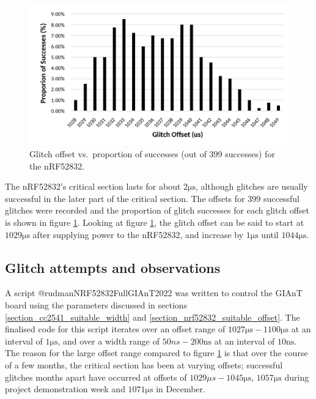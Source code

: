 \begin{figure}
\centering
\includegraphics[width=5.72917in,height=\textheight]{res/nrf52832_offset_vs_success.png}
\caption{Glitch offset vs.~proportion of successes (out of 399
successes) for the nRF52832.\label{img_nrf52832_offset_vs_success}}
\end{figure}

The nRF52832's critical section lasts for about \(2\si{\micro\second}\),
although glitches are usually successful in the later part of the
critical section. The offsets for 399 successful glitches were recorded
and the proportion of glitch successes for each glitch offset is shown
in figure \ref{img_nrf52832_offset_vs_success}. Looking at figure
\ref{img_nrf52832_offset_vs_success}, the glitch offset can be said to
start at \(1029\si{\micro\second}\) after supplying power to the
nRF52832, and increase by \(1\si{\micro\second}\) until
\(1044\si{\micro\second}\).

\newpage

\hypertarget{glitch-attempts-and-observations}{%
\subsection{\texorpdfstring{Glitch attempts and
observations\label{section_nrf52832_observations}}{Glitch attempts and observations}}\label{glitch-attempts-and-observations}}

A script @rudmanNRF52832FullGIAnT2022 was written to control the GIAnT
board using the parameters discussed in sections
\ref{section_cc2541_suitable_width} and
\ref{section_nrf52832_suitable_offset}. The finalised code for this
script iterates over an offset range of
\(1027\si{\micro\second} - 1100\si{\micro\second}\) at an interval of
\(1\si{\micro\second}\), and over a width range of
\(50ns - 200\si{\nano\second}\) at an interval of
\(10\si{\nano\second}\). The reason for the large offset range compared
to figure \ref{img_nrf52832_offset_vs_success} is that over the course
of a few months, the critical section has been at varying offsets;
successful glitches months apart have occurred at offsets of
\(1029\mu s - 1045\si{\micro\second}\), \(1057\si{\micro\second}\)
during project demonstration week and \(1071\si{\micro\second}\) in
December.

